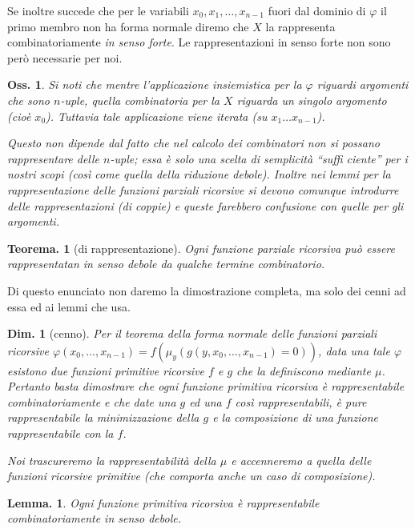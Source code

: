 \documentclass{book}
\newtheorem{osservazione}{Oss.}[chapter]
\newtheorem{teorema}{Teorema.}[chapter]
\newtheorem{lemma}{Lemma.}[chapter]
\newtheorem{dimostrazione}{Dim.}[chapter]
\begin{document}
Se inoltre succede che per le variabili $x_0, x_1,  \ldots, x_{n-1}$ fuori
dal dominio di $\varphi$ il primo membro non ha forma normale diremo che $X$ la
rappresenta combinatoriamente \emph{in senso forte}. Le rappresentazioni in 
senso forte non sono per\`o necessarie per noi.

\begin{osservazione}
Si noti che mentre l'applicazione insiemistica per la $\varphi$ riguardi 
argomenti che sono $n$-uple, quella combinatoria per la $X$ riguarda un singolo
 argomento (cio\`e $x_0$). Tuttavia tale applicazione viene iterata (su $x_1
\ldots x_{n-1}$).

Questo non dipende dal fatto che nel calcolo dei combinatori non si possano 
rappresentare delle $n$-uple; essa \`e solo una scelta di semplicit\`a ``suffi
ciente'' per i nostri scopi (cos\`i come quella della riduzione debole).
Inoltre nei lemmi per la rappresentazione delle funzioni parziali ricorsive si 
devono comunque introdurre delle rappresentazioni (di coppie) e queste 
farebbero confusione con quelle per gli argomenti.
\end{osservazione}

\begin{teorema}[di rappresentazione]
Ogni funzione parziale ricorsiva pu\`o essere rappresentatan in senso debole 
da qualche termine combinatorio.
\end{teorema}
Di questo enunciato non daremo la 
dimostrazione completa, ma solo dei cenni ad essa ed ai lemmi che usa.

\begin{dimostrazione}[cenno]
Per il teorema della forma normale delle funzioni parziali ricorsive $\varphi(
x_0, \ldots , x_{n-1}) = f(\mu_y(g(y, x_0, \ldots , x_{n-1}) = 0))$, data una 
tale $\varphi$ esistono due funzioni primitive ricorsive $f$ e $g$ che la 
definiscono mediante $\mu$. Pertanto basta dimostrare che ogni funzione 
primitiva ricorsiva \`e rappresentabile combinatoriamente e che date una $g$ 
ed una $f$ cos\`i rappresentabili, \`e pure rappresentabile la minimizzazione 
della $g$ e la composizione di una funzione rappresentabile con la $f$.

Noi trascureremo la rappresentabilit\`a della $\mu$ e accenneremo a quella 
delle funzioni ricorsive primitive (che comporta anche un caso di 
composizione).
\end{dimostrazione}

\begin{lemma}
Ogni funzione primitiva ricorsiva \`e rappresentabile combinatoriamente in 
senso debole.
\end{lemma}
\end{document}
